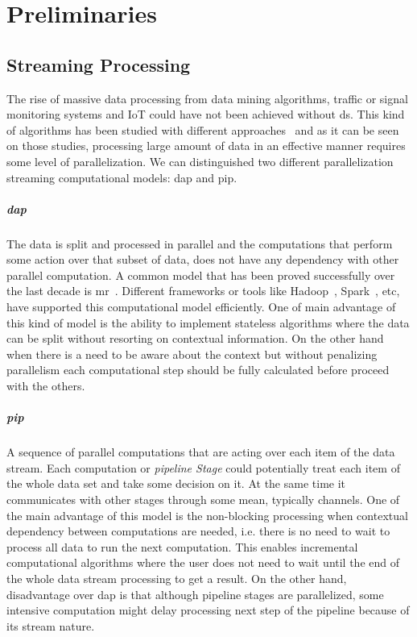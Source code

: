\chapter{Preliminaries}\label{chapter:2}
\section{Streaming Processing}
The rise of massive data processing from data mining algorithms, traffic or signal monitoring systems and IoT could have not been 
achieved without \acrfull{ds}. This kind of algorithms has been studied with different approaches~\cite{enumeratingsg, exploting, onthefly} and as
it can be seen on those studies, processing large amount of data in an effective manner requires some level of parallelization.
We can distinguished two different parallelization streaming computational models: \acrfull{dap} and \acrfull{pip}. 

\paragraph{\acrlong{dap}} The data is split and processed in parallel and the computations that perform some action over that subset of data, does not have any dependency with other parallel computation. 
A common model that has been proved successfully over the last decade is \acrfull{mr}~\cite{mapreduce}. Different frameworks or tools like Hadoop~\cite{hadoop}, Spark~\cite{apachespark}, etc, have supported this computational 
model efficiently. One of main advantage of this kind of model is the ability to implement stateless algorithms where the data can be split without resorting on contextual information. On the other hand
when there is a need to be aware about the context but without penalizing parallelism each computational step should be fully calculated before proceed with the others.

\paragraph{\acrlong{pip}} A sequence of parallel computations that are acting over each item of the data stream. Each computation or \emph{pipeline Stage} could potentially
treat each item of the whole data set and take some decision on it. At the same time it communicates with other stages through some mean, typically channels. One of the main advantage of this model is the non-blocking processing
when contextual dependency between computations are needed, i.e. there is no need to wait to process all data to run the next computation. This enables incremental computational algorithms where the user does not need to 
wait until the end of the whole data stream processing to get a result. On the other hand, disadvantage over \acrshort{dap} is that although pipeline stages are parallelized, 
some intensive computation might delay processing next step of the pipeline because of its stream nature. 

